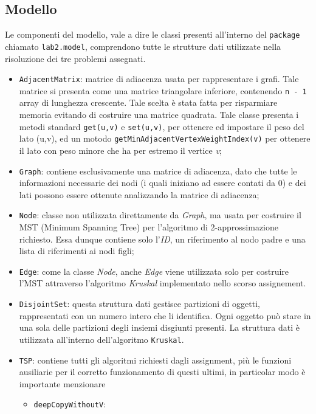 \subsection{Modello}
Le componenti del modello, vale a dire le classi presenti all'interno del \texttt{package} chiamato \texttt{lab2.model}, comprendono tutte le strutture dati utilizzate nella risoluzione dei tre problemi assegnati. 
\begin{itemize}
	\item \texttt{AdjacentMatrix}: matrice di adiacenza usata per rappresentare i grafi. Tale matrice si presenta come una matrice triangolare inferiore, contenendo \texttt{n - 1} array di lunghezza crescente. Tale scelta è stata fatta per risparmiare memoria evitando di costruire una matrice quadrata. Tale classe presenta i metodi standard \texttt{get(u,v)} e \texttt{set(u,v)}, per ottenere ed impostare il peso del lato (u,v), ed un motodo \texttt{getMinAdjacentVertexWeightIndex(v)} per ottenere il lato con peso minore che ha per estremo il vertice \textit{v};
	\item \texttt{Graph}: contiene esclusivamente una matrice di adiacenza, dato che tutte le informazioni necessarie dei nodi (i quali iniziano ad essere contati da 0) e dei lati possono essere ottenute analizzando la matrice di adiacenza;
	\item \texttt{Node}: classe non utilizzata direttamente da \textit{Graph}, ma usata per costruire il MST (Minimum Spanning Tree) per l'algoritmo di 2-approssimazione richiesto. Essa dunque contiene solo l'\textit{ID}, un riferimento al nodo padre e una lista di riferimenti ai nodi figli;
	\item \texttt{Edge}: come la classe \textit{Node}, anche \textit{Edge} viene utilizzata solo per costruire l'MST attraverso l'algoritmo \textit{Kruskal} implementato nello scorso assignement.
	\item \texttt{DisjointSet}: questa struttura dati gestisce partizioni di oggetti, rappresentati con un numero intero che li identifica. Ogni oggetto può stare in una sola delle partizioni degli insiemi disgiunti presenti. La struttura dati è utilizzata all'interno dell'algoritmo \texttt{Kruskal}.
	\item \texttt{TSP}: contiene tutti gli algoritmi richiesti dagli assignment, più le funzioni ausiliarie per il corretto funzionamento di questi ultimi, in particolar modo è importante menzionare
	\begin{itemize}
		\item \texttt{deepCopyWithoutV}:

\end{itemize}
\end{itemize}
